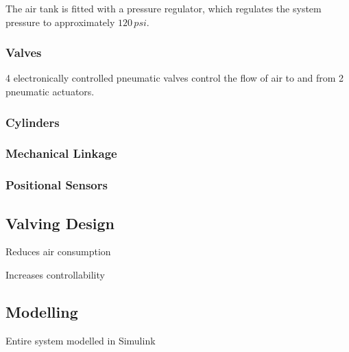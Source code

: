 The air tank is fitted with a pressure regulator, which regulates the system pressure to approximately $120\,psi$. 

\subsubsection{Valves}

4 electronically controlled pneumatic valves control the flow of air to and from 2 pneumatic actuators.

\subsubsection{Cylinders}


\subsubsection{Mechanical Linkage }


\subsubsection{Positional Sensors }


\subsection{Valving Design}

Reduces air consumption

Increases controllability


\subsection{Modelling}

Entire system modelled in Simulink